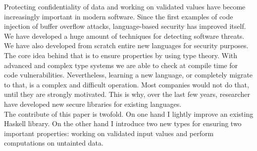 Protecting confidentiality of data and working on validated values have become increasingly important in modern software. Since the first examples of code injection of buffer overflow attacks, language-based security has improved itself. We have developed a huge amount of techniques for detecting software threats. We have also developed from scratch entire new languages for security purposes. \\
The core idea behind that is to ensure properties by using type theory. With advanced and complex type systems we are able to check at compile time for code vulnerabilities. Nevertheless, learning a new language, or completely migrate to that, is a complex and difficult operation. Most companies would not do that, until they are strongly motivated. This is why, over the last few years, researcher have developed new secure libraries for existing languages. \\
The contribute of this paper is twofold. On one hand I lightly improve an existing Haskell library. On the other hand I introduce two new types for ensuring two important properties: working on validated input values and perform computations on untainted data.